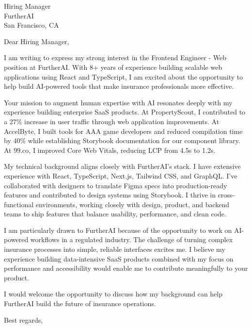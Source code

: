 \documentclass[11pt]{letter}
\begin{document}
\begin{letter}{%
Hiring Manager \\
FurtherAI \\
San Francisco, CA
}

\opening{Dear Hiring Manager,}

I am writing to express my strong interest in the Frontend Engineer - Web position at FurtherAI. With 8+ years of experience building scalable web applications using React and TypeScript, I am excited about the opportunity to help build AI-powered tools that make insurance professionals more effective.

Your mission to augment human expertise with AI resonates deeply with my experience building enterprise SaaS products. At PropertyScout, I contributed to a 27\% increase in user traffic through web application improvements. At AccelByte, I built tools for AAA game developers and reduced compilation time by 40\% while establishing Storybook documentation for our component library. At 99.co, I improved Core Web Vitals, reducing LCP from 4.5s to 1.2s.

My technical background aligns closely with FurtherAI's stack. I have extensive experience with React, TypeScript, Next.js, Tailwind CSS, and GraphQL. I've collaborated with designers to translate Figma specs into production-ready features and contributed to design systems using Storybook. I thrive in cross-functional environments, working closely with design, product, and backend teams to ship features that balance usability, performance, and clean code.

I am particularly drawn to FurtherAI because of the opportunity to work on AI-powered workflows in a regulated industry. The challenge of turning complex insurance processes into simple, reliable interfaces excites me. I believe my experience building data-intensive SaaS products combined with my focus on performance and accessibility would enable me to contribute meaningfully to your product.

I would welcome the opportunity to discuss how my background can help FurtherAI build the future of insurance operations.

\closing{Best regards,}

\end{letter}
\end{document}
